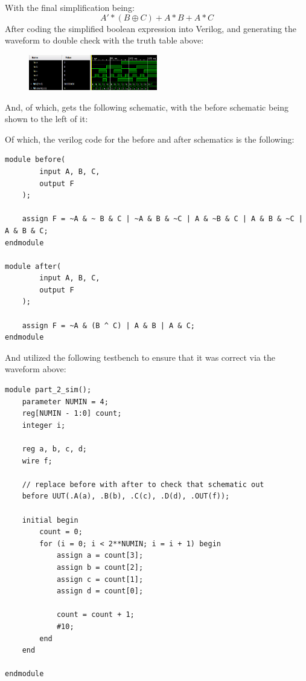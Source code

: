 With the final simplification being:
$$ A'*(B \oplus C) + A*B + A*C $$
After coding the simplified boolean expression into Verilog, and generating the waveform to double check with the truth table above:
\begin{figure}[!htbp]
    \centering
    \includegraphics[width=0.5\textwidth]{part-2-waveform.png}
    \label{Part 2 Waveform}
\end{figure}\newline
And, of which, gets the following schematic, with the before schematic being shown to the left of it:
\begin{figure}[!htbp]
    \centering
    \qquad
\end{figure}\newpage
Of which, the verilog code for the before and after schematics is the following:
\begin{lstlisting}[caption={Part 2 Verilog Code}, label={Part 2 Verilog}, style=Verilog]
module before(
        input A, B, C,
        output F
    );
   
    assign F = ~A & ~ B & C | ~A & B & ~C | A & ~B & C | A & B & ~C | A & B & C;
endmodule

module after(
        input A, B, C,
        output F
    );
   
    assign F = ~A & (B ^ C) | A & B | A & C;
endmodule
\end{lstlisting}\newpage
And utilized the following testbench to ensure that it was correct via the waveform above:
\begin{lstlisting}[caption={Part 2 Testbench}, label={Part 2 Testbench}, style=Verilog]
module part_2_sim();
    parameter NUMIN = 4;
    reg[NUMIN - 1:0] count;
    integer i;
    
    reg a, b, c, d;
    wire f;
    
    // replace before with after to check that schematic out
    before UUT(.A(a), .B(b), .C(c), .D(d), .OUT(f));
    
    initial begin
        count = 0;
        for (i = 0; i < 2**NUMIN; i = i + 1) begin
            assign a = count[3];
            assign b = count[2];
            assign c = count[1];
            assign d = count[0];
            
            count = count + 1;
            #10;
        end
    end
    
endmodule
\end{lstlisting}


